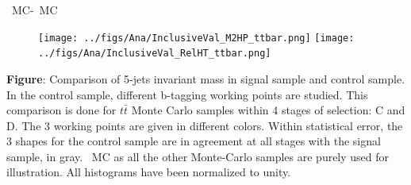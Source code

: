 \begin{frame}{\ttbar~MC-\ttbar~MC}
\vspace{-.2cm}
\begin{figure}[!Hhtbp]
  \begin{center}
    \texttt{[image: ../figs/Ana/InclusiveVal\_M2HP\_ttbar.png]}
    \texttt{[image: ../figs/Ana/InclusiveVal\_RelHT\_ttbar.png]}
  \end{center}
\end{figure}

\vspace{-.2cm}
    \begin{block}{}\tiny
      \textbf{Figure}: Comparison of 5-jets invariant mass in signal sample and control sample. In the control sample, different b-tagging working points are studied. This comparison is done for $t\bar{t}$ Monte Carlo samples within 4 stages of selection: C and D. The 3 working points are given in different colors. Within statistical error, the 3 shapes for the control sample are in agreement at all stages with the signal sample, in gray. \ttbar~MC as all the other Monte-Carlo samples are purely used for illustration. All histograms have been normalized to unity.
    \end{block}

\end{frame}

